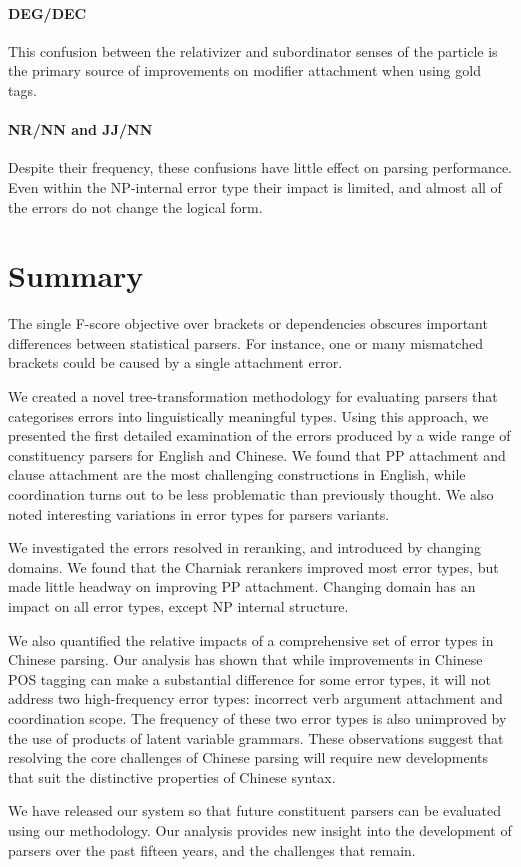 \paragraph{DEG/DEC}  This confusion between the relativizer and subordinator
senses of the particle  is the primary
source of improvements on modifier attachment when using gold tags.

\paragraph{NR/NN and JJ/NN}  Despite their frequency, these confusions have
little effect on parsing performance.  Even within the NP-internal error type
their impact is limited, and almost all of the errors do not change the
logical form.

\section{Summary}

The single F-score objective over brackets or dependencies obscures important differences between statistical parsers.
For instance, one or many mismatched brackets could be caused by a single attachment error.

We created a novel tree-transformation methodology for
evaluating parsers that categorises errors into linguistically meaningful
types.  Using this approach, we presented the first detailed examination of the
errors produced by a wide range of constituency parsers for
English and Chinese.  We found that PP attachment and clause attachment are the most
challenging constructions in English, while coordination turns out to be less problematic
than previously thought.  We also noted interesting variations in error types
for parsers variants.

We investigated the errors resolved in reranking, and introduced by changing
domains. We found that the Charniak rerankers improved most error types, but
made little headway on improving PP attachment.  Changing domain has an impact
on all error types, except NP internal structure.

We also quantified the relative impacts of a comprehensive set of error types
in Chinese parsing.  Our analysis has shown that while improvements in
Chinese POS tagging can make a substantial difference for some error types,
it will not address two high-frequency error types: incorrect verb argument
attachment and coordination scope.  The frequency of these two error types is
also unimproved by the use of products of latent variable grammars.  These
observations suggest that resolving the core challenges of Chinese parsing
will require new developments that suit the distinctive properties of Chinese
syntax.

We have released our system so that future constituent parsers can be evaluated
using our methodology.  Our analysis provides new insight into the development
of parsers over the past fifteen years, and the challenges that remain.

